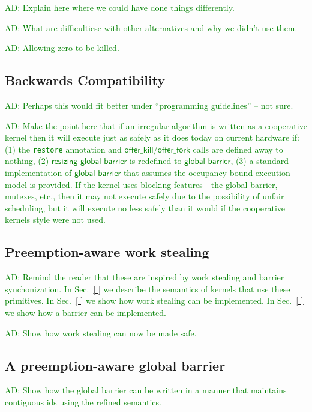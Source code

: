\documentclass[nocopyrightspace]{sigplanconf-pldi16}
\newcommand{\ADComment}[1]{\textcolor{green}{AD: #1}}
\newcommand{\mysec}{Sec.~}
\newcommand{\restore}{\texttt{restore}}
\newcommand{\offerfork}{\mathsf{offer\_fork}}
\newcommand{\offerkill}{\mathsf{offer\_kill}}
\newcommand{\globalbarrier}{\mathsf{global\_barrier}}
\newcommand{\resizingglobalbarrier}{\mathsf{resizing\_global\_barrier}}
\begin{document}
\ADComment{Explain here where we could have done things differently.}

\ADComment{What are difficultiese with other alternatives and why we didn't use them.}

\ADComment{Allowing zero to be killed.}

\subsection{Backwards Compatibility}

\ADComment{Perhaps this would fit better under ``programming guidelines'' -- not sure.}

\ADComment{Make the point here that if an irregular algorithm is
  written as a cooperative kernel then it will execute just as safely
  as it does today on current hardware if: (1) the \restore
  annotation and $\offerkill$/$\offerfork$ calls are defined away to
  nothing, (2) $\resizingglobalbarrier$ is redefined to
  $\globalbarrier$, (3) a standard implementation of $\globalbarrier$
  that assumes the occupancy-bound execution model is provided.  If the kernel uses blocking features---the global barrier, mutexes, etc., then it may not execute safely due to the possibility of unfair scheduling, but it will execute no less safely than it would if the cooperative kernels style were not used.}





\subsection{Preemption-aware work stealing}

\ADComment{Remind the reader that these are inspired by work stealing
  and barrier synchonization.  In \mysec\ref{ } we describe the
  semantics of kernels that use these primitives.  In \mysec\ref{ } we
  show how work stealing can be implemented.  In \mysec\ref{ } we show
  how a barrier can be implemented.}

\ADComment{Show how work stealing can now be made safe.}

\subsection{A preemption-aware global barrier}

\ADComment{Show how the global barrier can be written in a manner that
  maintains contiguous ids using the refined semantics.}
\end{document}
